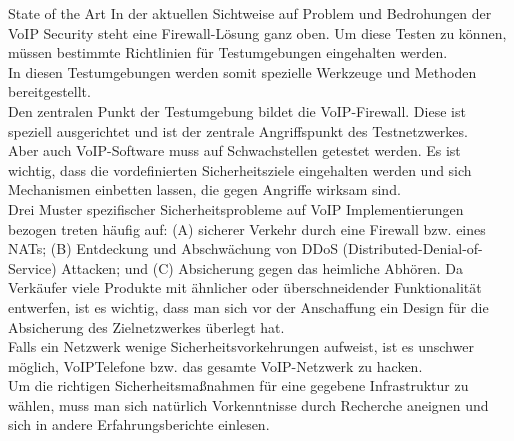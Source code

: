 \documentclass[a4paper,11pt,ngerman]{INSOexpose}
\begin{document}
\begin{section}{State of the Art}
In der aktuellen Sichtweise auf Problem und Bedrohungen der VoIP Security steht eine
Firewall-Lösung ganz oben.
Um diese Testen zu können, müssen bestimmte Richtlinien für Testumgebungen eingehalten
werden.
\cite[Ronniger]{Ronniger:2010:robflex} \\
In diesen Testumgebungen werden somit spezielle Werkzeuge und Methoden bereitgestellt. 
\cite[Abdelnur]{Abdelnur:2006:voipass} \\
Den zentralen Punkt der Testumgebung bildet die VoIP-Firewall. Diese ist speziell
ausgerichtet und ist der zentrale Angriffspunkt des Testnetzwerkes.
\cite[Coulibaly]{Coulibaly:2010:secvoipb} \cite[Strobel]{strobel:2003:firewalls} \\
Aber auch VoIP-Software muss auf Schwachstellen getestet werden.
Es ist wichtig, dass die vordefinierten Sicherheitsziele eingehalten werden und sich
Mechanismen einbetten lassen, die gegen Angriffe wirksam sind.
\cite[Butcher]{Butcher:2007:SecChall} \cite[Eckert]{eckert:2009:sicherheit} \\
Drei Muster spezifischer Sicherheitsprobleme auf VoIP Implementierungen bezogen treten
häufig auf: (A) sicherer Verkehr durch eine Firewall bzw. eines NATs; (B) Entdeckung und
Abschwächung von DDoS (Distributed-Denial-of-Service) Attacken; und (C) Absicherung
gegen das heimliche Abhören. Da Verkäufer viele Produkte mit ähnlicher oder
überschneidender Funktionalität entwerfen, ist es wichtig, dass man sich vor der
Anschaffung ein Design für die Absicherung des Zielnetzwerkes überlegt hat.
\cite[Anwar]{Anwar:2006:despatt} \\
Falls ein Netzwerk wenige Sicherheitsvorkehrungen aufweist, ist es unschwer möglich, VoIPTelefone
bzw. das gesamte VoIP-Netzwerk zu hacken.
\cite[Endler]{endler:2006:hacking} \\
Um die richtigen Sicherheitsmaßnahmen für eine gegebene Infrastruktur zu wählen, muss
man sich natürlich Vorkenntnisse durch Recherche aneignen und sich in andere
Erfahrungsberichte einlesen. 
\cite[Egger]{Egger:2008:linVoip} \cite[Eren]{eren:2007:voip} \cite[Porter]{porter:2006:practicalvoip} \\

\end{section}
\pagebreak
\end{document}
